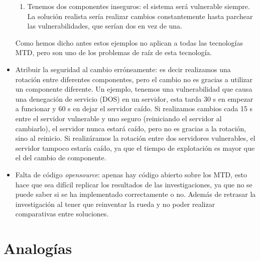\begin{itemize}
\begin{enumerate}
        \item Tenemos dos componentes inseguros: el sistema será vulnerable siempre. La solución realista sería realizar cambios constantemente hasta parchear las vulnerabilidades, que serían dos en vez de una.
    \end{enumerate}
    Como hemos dicho antes estos ejemplos no aplican a todas las tecnologías MTD, pero son uno de los problemas de raíz de esta tecnología.
    \item Atribuir la seguridad al cambio erróneamente: es decir realizamos una rotación entre diferentes componentes, pero el cambio no es gracias a utilizar un componente diferente. Un ejemplo, tenemos una vulnerabilidad que causa una denegación de servicio (DOS) en un servidor, esta tarda 30 s en empezar a funcionar y 60 s en dejar el servidor caído. Si realizamos cambios cada 15 s entre el servidor vulnerable y uno seguro (reiniciando el servidor al cambiarlo), el servidor nunca estará caído, pero no es gracias a la rotación, sino al reinicio. Si realizáramos la rotación entre dos servidores vulnerables, el servidor tampoco estaría caído, ya que el tiempo de explotación es mayor que el del cambio de componente.
    \item Falta de código \textit{opensource}: apenas hay código abierto sobre los MTD, esto hace que sea difícil replicar los resultados de las investigaciones, ya que no se puede saber si se ha implementado correctamente o no. Además de retrasar la investigación al tener que reinventar la rueda y no poder realizar comparativas entre soluciones.
\end{itemize}

\section{Analogías}

